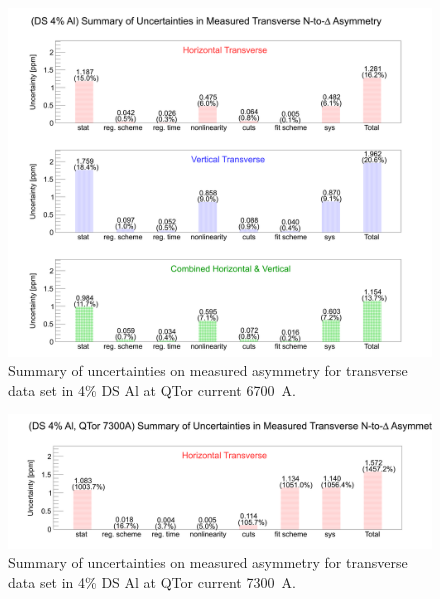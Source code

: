\begin{figure}[!h]
	\begin{center}
	\includegraphics[width=15.0cm]{figures/errorChartAl_6700A}
	\end{center}
	\caption
	{Summary of uncertainties on measured asymmetry for transverse data set in 4\% DS Al at QTor current 6700~A.}
	\label{fig:errorChartAl_6700A}
\end{figure}

\begin{figure}[!h]
	\begin{center}
	\includegraphics[width=15.0cm]{figures/errorChartAl_7300A}
	\end{center}
	\caption
	{Summary of uncertainties on measured asymmetry for transverse data set in 4\% DS Al at QTor current 7300~A.}
	\label{fig:errorChartAl_7300A}
\end{figure}

